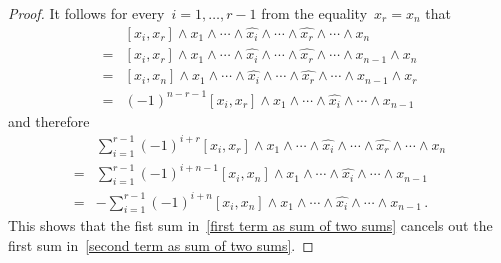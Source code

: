 \begin{proof}
  It follows for every~$i = 1, \dotsc, r-1$ from the equality~$x_r = x_n$ that
  \begin{align*}
    {}&
    [x_i, x_r] \wedge x_1 \wedge \dotsb \wedge \widehat{x_i} \wedge \dotsb \wedge \widehat{x_r} \wedge \dotsb \wedge x_n
    \\
    ={}&
    [x_i, x_r] \wedge x_1 \wedge \dotsb \wedge \widehat{x_i} \wedge \dotsb \wedge \widehat{x_r} \wedge \dotsb \wedge x_{n-1} \wedge x_n
    \\
    ={}&
    [x_i, x_n] \wedge x_1 \wedge \dotsb \wedge \widehat{x_i} \wedge \dotsb \wedge \widehat{x_r} \wedge \dotsb \wedge x_{n-1} \wedge x_r
    \\
    ={}&
    (-1)^{n-r-1}
    [x_i, x_r] \wedge x_1 \wedge \dotsb \wedge \widehat{x_i} \wedge \dotsb \wedge x_{n-1}
  \end{align*}
  and therefore
  \begin{align*} 
    {}&
    \sum_{i=1}^{r-1}
    (-1)^{i+r}
    [x_i, x_r] \wedge x_1 \wedge \dotsb \wedge \widehat{x_i} \wedge \dotsb \wedge \widehat{x_r} \wedge \dotsb \wedge x_n
    \\
    ={}&
    \sum_{i=1}^{r-1}
    (-1)^{i+n-1}
    [x_i, x_n] \wedge x_1 \wedge \dotsb \wedge \widehat{x_i} \wedge \dotsb \wedge x_{n-1}
    \\
    ={}&
    -
    \sum_{i=1}^{r-1}
    (-1)^{i+n}
    [x_i, x_n] \wedge x_1 \wedge \dotsb \wedge \widehat{x_i} \wedge \dotsb \wedge x_{n-1} \,.
  \end{align*}
  This shows that the fist sum in~\eqref{first term as sum of two sums} cancels out the first sum in~\eqref{second term as sum of two sums}.


\end{proof}
